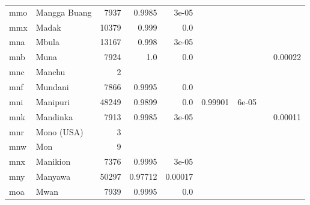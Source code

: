 \documentclass[11pt]{article}
\begin{document}
\begin{table*}[h]
{\begin{tabular}{llrrrrrrr}
mmo         & Mangga Buang         & 7937         & 0.9985         & 3e-05         &          &          &          &          \\

mmx         & Madak         & 10379         & 0.999         & 0.0         &          &          &          &          \\

mna         & Mbula         & 13167         & 0.998         & 3e-05         &          &          &          &          \\

mnb         & Muna         & 7924         & 1.0         & 0.0         &          &          &          & 0.00022         \\

mnc         & Manchu         & 2         &          &          &          &          &          &          \\

mnf         & Mundani         & 7866         & 0.9995         & 0.0         &          &          &          &          \\

mni         & Manipuri         & 48249         & 0.9899         & 0.0         & 0.99901         & 6e-05         &          &          \\

mnk         & Mandinka         & 7913         & 0.9985         & 3e-05         &          &          &          & 0.00011         \\

mnr         & Mono (USA)         & 3         &          &          &          &          &          &          \\

mnw         & Mon         & 9         &          &          &          &          &          &          \\

mnx         & Manikion         & 7376         & 0.9995         & 3e-05         &          &          &          &          \\

mny         & Manyawa         & 50297         & 0.97712         & 0.00017         &          &          &          &          \\

moa         & Mwan         & 7939         & 0.9995         & 0.0         &          &          &          &          \\


\end{tabular}}
\end{table*}
\end{document}

